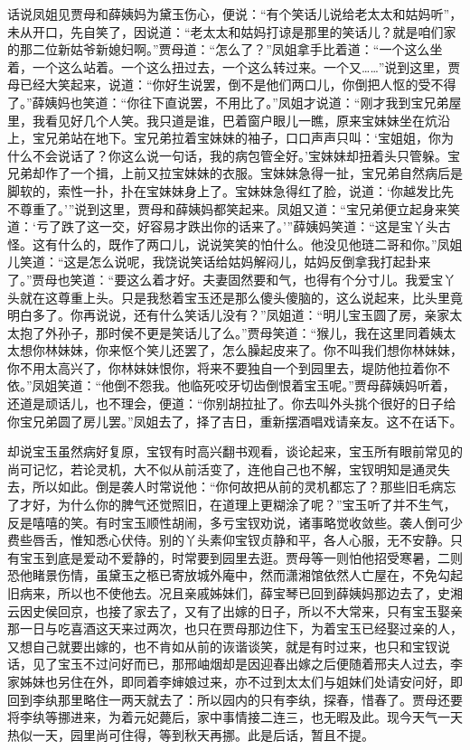 


\begin{parag}
    话说凤姐见贾母和薛姨妈为黛玉伤心，便说：“有个笑话儿说给老太太和姑妈听”，未从开口，先自笑了，因说道：“老太太和姑妈打谅是那里的笑话儿？就是咱们家的那二位新姑爷新媳妇啊。”贾母道：“怎么了？”凤姐拿手比着道：“一个这么坐着，一个这么站着。一个这么扭过去，一个这么转过来。一个又……”说到这里，贾母已经大笑起来，说道：“你好生说罢，倒不是他们两口儿，你倒把人怄的受不得了。”薛姨妈也笑道：“你往下直说罢，不用比了。”凤姐才说道：“刚才我到宝兄弟屋里，我看见好几个人笑。我只道是谁，巴着窗户眼儿一瞧，原来宝妹妹坐在炕沿上，宝兄弟站在地下。宝兄弟拉着宝妹妹的袖子，口口声声只叫：‘宝姐姐，你为什么不会说话了？你这么说一句话，我的病包管全好。’宝妹妹却扭着头只管躲。宝兄弟却作了一个揖，上前又拉宝妹妹的衣服。宝妹妹急得一扯，宝兄弟自然病后是脚软的，索性一扑，扑在宝妹妹身上了。宝妹妹急得红了脸，说道：‘你越发比先不尊重了。’”说到这里，贾母和薛姨妈都笑起来。凤姐又道：“宝兄弟便立起身来笑道：‘亏了跌了这一交，好容易才跌出你的话来了。’”薛姨妈笑道：“这是宝丫头古怪。这有什么的，既作了两口儿，说说笑笑的怕什么。他没见他琏二哥和你。”凤姐儿笑道：“这是怎么说呢，我饶说笑话给姑妈解闷儿，姑妈反倒拿我打起卦来了。”贾母也笑道：“要这么着才好。夫妻固然要和气，也得有个分寸儿。我爱宝丫头就在这尊重上头。只是我愁着宝玉还是那么傻头傻脑的，这么说起来，比头里竟明白多了。你再说说，还有什么笑话儿没有？”凤姐道：“明儿宝玉圆了房，亲家太太抱了外孙子，那时侯不更是笑话儿了么。”贾母笑道：“猴儿，我在这里同着姨太太想你林妹妹，你来怄个笑儿还罢了，怎么臊起皮来了。你不叫我们想你林妹妹，你不用太高兴了，你林妹妹恨你，将来不要独自一个到园里去，堤防他拉着你不依。”凤姐笑道：“他倒不怨我。他临死咬牙切齿倒恨着宝玉呢。”贾母薛姨妈听着，还道是顽话儿，也不理会，便道：“你别胡拉扯了。你去叫外头挑个很好的日子给你宝兄弟圆了房儿罢。”凤姐去了，择了吉日，重新摆酒唱戏请亲友。这不在话下。
\end{parag}


\begin{parag}
    却说宝玉虽然病好复原，宝钗有时高兴翻书观看，谈论起来，宝玉所有眼前常见的尚可记忆，若论灵机，大不似从前活变了，连他自己也不解，宝钗明知是通灵失去，所以如此。倒是袭人时常说他：“你何故把从前的灵机都忘了？那些旧毛病忘了才好，为什么你的脾气还觉照旧，在道理上更糊涂了呢？”宝玉听了并不生气，反是嘻嘻的笑。有时宝玉顺性胡闹，多亏宝钗劝说，诸事略觉收敛些。袭人倒可少费些唇舌，惟知悉心伏侍。别的丫头素仰宝钗贞静和平，各人心服，无不安静。只有宝玉到底是爱动不爱静的，时常要到园里去逛。贾母等一则怕他招受寒暑，二则恐他睹景伤情，虽黛玉之柩已寄放城外庵中，然而潇湘馆依然人亡屋在，不免勾起旧病来，所以也不使他去。况且亲戚姊妹们，薛宝琴已回到薛姨妈那边去了，史湘云因史侯回京，也接了家去了，又有了出嫁的日子，所以不大常来，只有宝玉娶亲那一日与吃喜酒这天来过两次，也只在贾母那边住下，为着宝玉已经娶过亲的人，又想自己就要出嫁的，也不肯如从前的诙谐谈笑，就是有时过来，也只和宝钗说话，见了宝玉不过问好而已，那邢岫烟却是因迎春出嫁之后便随着邢夫人过去，李家姊妹也另住在外，即同着李婶娘过来，亦不过到太太们与姐妹们处请安问好，即回到李纨那里略住一两天就去了：所以园内的只有李纨，探春，惜春了。贾母还要将李纨等挪进来，为着元妃薨后，家中事情接二连三，也无暇及此。现今天气一天热似一天，园里尚可住得，等到秋天再挪。此是后话，暂且不提。
\end{parag}


